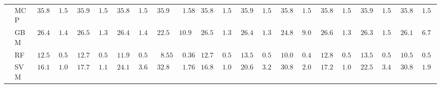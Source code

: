 \begin{tabular}{llllllllllllllllllllll}
	& MCP  & $35.89$ & $1.57$ & $35.90$ & $1.58$ & $35.89$ & $1.58$ & $35.90$ & $\phantom{0}1.58$ & $35.89$ & $1.57$ & $35.91$ & $1.58$ & $35.88$ & $1.58$ & $35.89$ & $1.57$ & $35.90$ & $1.57$ & $35.88$ & $1.56$ \\
	& GBM  & $26.42$ & $1.46$ & $26.50$ & $1.30$ & $26.47$ & $1.43$ & $22.57$ & $10.98$ & $26.52$ & $1.35$ & $26.43$ & $1.39$ & $24.88$ & $9.02$ & $26.62$ & $1.33$ & $26.37$ & $1.56$ & $26.19$ & $6.76$ \\
	& RF  & $12.54$ & $0.51$ & $12.79$ & $0.56$ & $11.97$ & $0.54$ & $\phantom{0}8.55$ & $\phantom{0}0.36$ & $12.75$ & $0.50$ & $13.53$ & $0.52$ & $10.04$ & $0.45$ & $12.83$ & $0.53$ & $13.57$ & $0.56$ & $10.55$ & $0.50$ \\
	& SVM  & $16.16$ & $1.04$ & $17.72$ & $1.11$ & $24.16$ & $3.62$ & $32.84$ & $\phantom{0}1.76$ & $16.81$ & $1.08$ & $20.60$ & $3.25$ & $30.84$ & $2.09$ & $17.26$ & $1.03$ & $22.55$ & $3.45$ & $30.80$ & $1.94$ \\
	\hline 
\end{tabular}